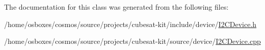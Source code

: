 The documentation for this class was generated from the following files\+:\begin{DoxyCompactItemize}
\item 
/home/osboxes/cosmos/source/projects/cubesat-\/kit/include/device/\hyperlink{I2CDevice_8h}{I2\+C\+Device.\+h}\item 
/home/osboxes/cosmos/source/projects/cubesat-\/kit/source/device/\hyperlink{I2CDevice_8cpp}{I2\+C\+Device.\+cpp}\end{DoxyCompactItemize}

